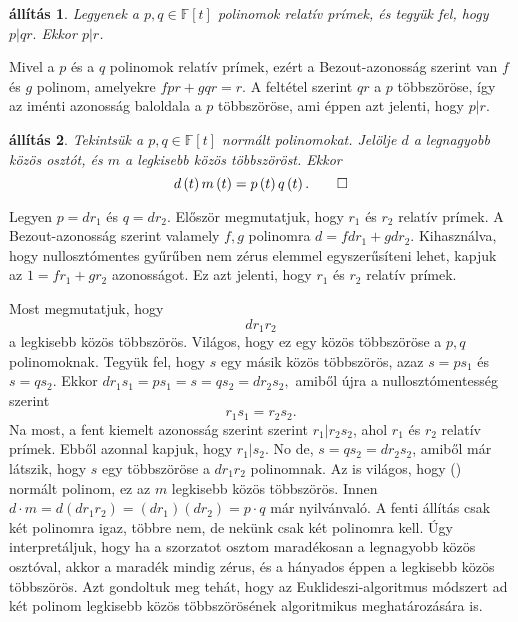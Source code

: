 \documentclass[a4paper, showtrims]{memoir}
\makeatletter
\renewenvironment{proof}[1][\proofname]
    {\par\pushQED{\qed}%
    \normalfont \topsep6\p@\@plus6\p@\relax
    \trivlist
    \item[\hskip\labelsep
        \itshape
    #1\@addpunct{:}]\ignorespaces}
    {\popQED\endtrivlist\@endpefalse}
\theoremstyle{plain}
\newtheorem{proposition}{állítás}[chapter]
\theoremstyle{remark}
\theoremstyle{definition}
\makeatother
\begin{document}
\begin{proposition}\label{pr:rprim}
	Legyenek a $p,q\in\mathbb{F}\left[ t \right]$ polinomok relatív prímek,
	és tegyük fel, hogy
	\begin{math}
		p|qr.
	\end{math}
	Ekkor $p|r$.
\end{proposition}
\begin{proof}
	Mivel a $p$ és a $q$ polinomok relatív prímek,
	ezért a Bezout-azonosság szerint van $f$ és $g$ polinom, amelyekre
	\(
	fpr+gqr=r.
	\)
	A feltétel szerint $qr$ a $p$ többszöröse,
	így az iménti azonosság baloldala a $p$ többszöröse,
	ami éppen azt jelenti, hogy $p|r$.
\end{proof}
\begin{proposition}
	Tekintsük a $p,q\in\mathbb{F}\left[ t \right]$ normált polinomokat.
	Jelölje $d$ a legnagyobb közös osztót,
	és
	$m$ a legkisebb közös többszöröst.
	Ekkor
	\begin{displaymath}
		d\left( t \right)m\left( t \right)=p\left( t \right)q\left( t \right).\qedhere
	\end{displaymath}
\end{proposition}
\begin{proof}
	Legyen $p=dr_1$ és $q=dr_2$.
	Először megmutatjuk, hogy $r_1$ és $r_2$ relatív prímek.
	A Bezout-azonosság szerint valamely $f,g$ polinomra
	\(
	d=fdr_1+gdr_2.
	\)
	Kihasználva, hogy nullosztómentes gyűrűben nem zérus elemmel egyszerűsíteni lehet,
	kapjuk az
	\(
	1=fr_1+gr_2
	\)
	azonosságot.
	Ez azt jelenti, hogy $r_1$ és $r_2$ relatív prímek.

	Most megmutatjuk, hogy
	\[
		dr_1r_2\tag{\dag}
	\]
	a legkisebb közös többszörös.
	Világos, hogy ez egy közös többszöröse a $p,q$ polinomoknak.
	Tegyük fel, hogy $s$ egy másik közös többszörös, azaz
	$s=ps_1$ és $s=qs_2$.
	Ekkor
	\begin{math}
		dr_1s_1=ps_1=s=qs_2=dr_2s_2,
	\end{math}
	amiből újra a nullosztómentesség szerint
	\[
		r_1s_1=r_2s_2.
	\]
	Na most,
	a fent kiemelt azonosság szerint szerint $r_1|r_2s_2$, ahol $r_1$ és $r_2$ relatív prímek.
	Ebből azonnal kapjuk, hogy $r_1|s_2$.
	No de, $s=qs_2=dr_2s_2$, amiből már látszik,
	hogy $s$ egy többszöröse a $dr_1r_2$ polinomnak.
	Az is világos, hogy (\dag) normált polinom, ez az $m$ legkisebb közös többszörös.
	Innen
	$d\cdot m=d(dr_1r_2)=(dr_1)(dr_2)=p\cdot q$ már nyilvánvaló.
\end{proof}
A fenti állítás csak két polinomra igaz, többre nem,
de nekünk csak két polinomra kell.
Úgy interpretáljuk,
hogy ha a szorzatot osztom maradékosan a legnagyobb közös osztóval, akkor a maradék mindig
zérus,
és a hányados éppen a legkisebb közös többszörös.
Azt gondoltuk meg tehát,
hogy az Euklideszi-algoritmus módszert ad két polinom legkisebb közös többszörösének algoritmikus meghatározására is.
\end{document}
